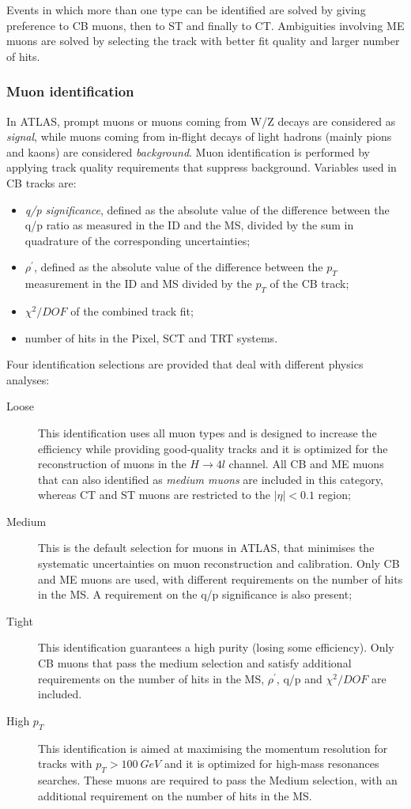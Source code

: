 \documentclass[a4paper,twoside,12pt]{article}
\begin{document}
Events in which more than one type can be identified are solved by giving preference
to CB muons, then to ST and finally to CT. Ambiguities involving ME muons are solved
by selecting the track with better fit quality and larger number of hits.

\subsubsection*{Muon identification}
In ATLAS, prompt muons or muons coming from W/Z decays are considered as \textit{signal}, 
while muons coming from in-flight decays of light hadrons (mainly pions and kaons) 
are considered \textit{background}. 
Muon identification is performed by applying track quality requirements that
suppress background. Variables used in CB tracks are:
\begin{itemize}
\item \textit{q/p significance}, defined as the absolute value of the difference between the q/p
ratio as measured in the ID and the MS, divided by the sum in quadrature of the corresponding
uncertainties;
\item $\mathit{\rho^{'}}$, defined as the absolute value of the difference between the $p_{T}$
measurement in the ID and MS divided by the $p_{T}$ of the CB track;
\item $\chi^{2}/DOF$ of the combined track fit;
\item number of hits in the Pixel, SCT and TRT systems.
\end{itemize}

Four identification selections are provided that deal with different physics analyses:
\begin{description}
\item [Loose] This identification uses all muon types and is designed to increase the efficiency while providing
good-quality tracks and it is optimized for the reconstruction of muons in the $H \rightarrow 4l$ channel. All CB and ME muons that can also identified as \textit{medium muons} are included in this category, whereas CT and ST muons are restricted to the $|\eta| < 0.1$ region;
\item [Medium] This is the default selection for muons in ATLAS, that minimises
the systematic uncertainties on muon reconstruction and calibration. Only CB and ME
muons are used, with different requirements on the number of hits in the MS. A requirement
on the q/p significance is also present;
\item [Tight] This identification guarantees a high purity (losing some efficiency). Only
CB muons that pass the medium selection and satisfy additional requirements on the number
of hits in the MS, $\rho^{'}$, q/p and $\chi^{2}/DOF$ are included. 
\item [High \boldmath$p_{T}$] This identification is aimed at maximising the momentum resolution
for tracks with $p_{T} > 100\ GeV$ and it is optimized for high-mass resonances searches. 
These muons are required to pass the Medium selection, with an additional requirement on 
the number of hits in the MS. 
\end{description}
\end{document}
